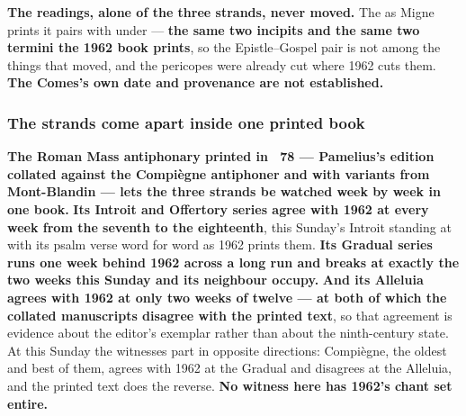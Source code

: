 \textbf{The readings, alone of the three strands, never moved.} The  as Migne prints it pairs  with  under  ---
\textbf{the same two incipits and the same two termini the 1962 book prints}, so
the Epistle--Gospel pair is not among the things that moved, and the pericopes
were already cut where 1962 cuts them. \textbf{The Comes's own date and
provenance are not established.}

\subsubsection*{The strands come apart inside one printed book}

\textbf{The Roman Mass antiphonary printed in ~78 ---
Pamelius's edition collated against the Compiègne antiphoner and with variants
from Mont-Blandin --- lets the three strands be watched week by week in one
book.} \textbf{Its Introit and Offertory series agree with 1962 at every week
from the seventh to the eighteenth}, this Sunday's Introit standing at
 with its psalm verse word for word as 1962
prints them. \textbf{Its Gradual series runs one week behind 1962 across a long
run and breaks at exactly the two weeks this Sunday and its neighbour occupy.}
\textbf{And its Alleluia agrees with 1962 at only two weeks of twelve --- at both
of which the collated manuscripts disagree with the printed text}, so that
agreement is evidence about the editor's exemplar rather than about the
ninth-century state. At this Sunday the witnesses part in opposite directions:
Compiègne, the oldest and best of them, agrees with 1962 at the Gradual and
disagrees at the Alleluia, and the printed text does the reverse.
\textbf{No witness here has 1962's chant set entire.}

